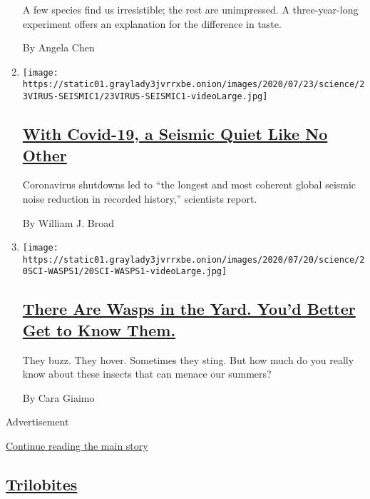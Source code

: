 \begin{enumerate}
  A few species find us irresistible; the rest are unimpressed. A
  three-year-long experiment offers an explanation for the difference in
  taste.

  By Angela Chen
\item
  \texttt{[image: https://static01.graylady3jvrrxbe.onion/images/2020/07/23/science/23VIRUS-SEISMIC1/23VIRUS-SEISMIC1-videoLarge.jpg]}

  \hypertarget{with-covid-19-a-seismic-quiet-like-no-other}{%
  \subsection{\texorpdfstring{\href{/2020/07/23/science/coronavirus-seismic-activity.html}{With
  Covid-19, a Seismic Quiet Like No
  Other}}{With Covid-19, a Seismic Quiet Like No Other}}\label{with-covid-19-a-seismic-quiet-like-no-other}}

  Coronavirus shutdowns led to ``the longest and most coherent global
  seismic noise reduction in recorded history,'' scientists report.

  By William J. Broad
\item
  \texttt{[image: https://static01.graylady3jvrrxbe.onion/images/2020/07/20/science/20SCI-WASPS1/20SCI-WASPS1-videoLarge.jpg]}

  \hypertarget{there-are-wasps-in-the-yard-youd-better-get-to-know-them}{%
  \subsection{\texorpdfstring{\href{/article/paper-wasps-yellowjackets.html}{There
  Are Wasps in the Yard. You'd Better Get to Know
  Them.}}{There Are Wasps in the Yard. You'd Better Get to Know Them.}}\label{there-are-wasps-in-the-yard-youd-better-get-to-know-them}}

  They buzz. They hover. Sometimes they sting. But how much do you
  really know about these insects that can menace our summers?

  By Cara Giaimo
\end{enumerate}

Advertisement

\protect\hyperlink{after-mid1}{Continue reading the main story}

\hypertarget{trilobites}{%
\subsection{\texorpdfstring{\href{/column/trilobites}{Trilobites}}{Trilobites}}\label{trilobites}}

